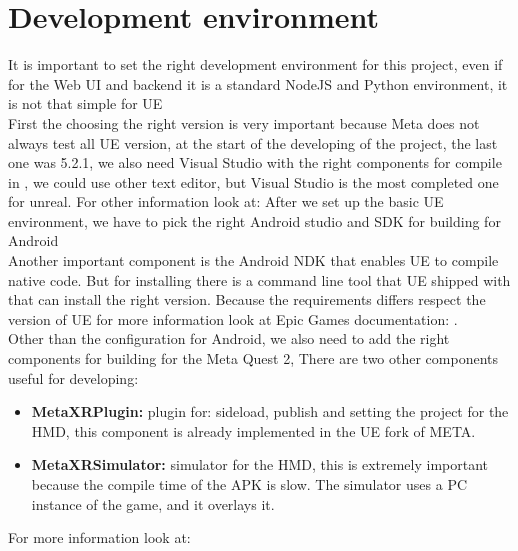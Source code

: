 \section{Development environment}
\noindent
It is important to set the right development environment for this project, even if for the Web \ac{UI} and backend it is a standard NodeJS and Python environment, 
it is not that simple for \ac{UE}\\
First the choosing the right version is very important because Meta does not always test all \ac{UE} version, at the start of the developing of the project, the last one was 5.2.1,
we also need Visual Studio with the right components for compile in \cpp, we could use other text editor, but Visual Studio is the most completed one for unreal.
For other information look at: \cite{UEvisualStudio}
After we set up the basic \ac{UE} environment, we have to pick the right Android studio and \ac{SDK} for building for Android \\
Another important component is the Android \ac{NDK} that enables \ac{UE} to compile native \cpp code.
But for installing there is a command line tool that \ac{UE} shipped with that can install the right version. 
Because the requirements differs respect the version of \ac{UE} for more information look at Epic Games documentation: \cite{UEandroid}.\\
Other than the configuration for Android, we also need to add the right components for building for the Meta Quest 2,
There are two other components useful for developing:
\begin{itemize}
  \item \textbf{MetaXRPlugin:} plugin for: sideload, publish and setting the project for the \ac{HMD}, this component is already implemented in the \ac{UE} fork of META.
  \item \textbf{MetaXRSimulator:} simulator for the \ac{HMD}, this is extremely important because the compile time of the \ac{APK} is slow. The simulator uses a PC instance of the game, and it overlays it.
\end{itemize}
\noindent
For more information look at: \cite{MetaSetup}

